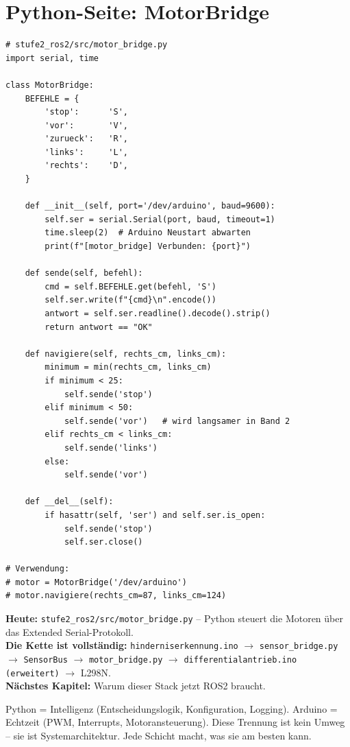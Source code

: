 \section{Python-Seite: MotorBridge}

\begin{lstlisting}[style=python]
# stufe2_ros2/src/motor_bridge.py
import serial, time

class MotorBridge:
    BEFEHLE = {
        'stop':      'S',
        'vor':       'V',
        'zurueck':   'R',
        'links':     'L',
        'rechts':    'D',
    }

    def __init__(self, port='/dev/arduino', baud=9600):
        self.ser = serial.Serial(port, baud, timeout=1)
        time.sleep(2)  # Arduino Neustart abwarten
        print(f"[motor_bridge] Verbunden: {port}")

    def sende(self, befehl):
        cmd = self.BEFEHLE.get(befehl, 'S')
        self.ser.write(f"{cmd}\n".encode())
        antwort = self.ser.readline().decode().strip()
        return antwort == "OK"

    def navigiere(self, rechts_cm, links_cm):
        minimum = min(rechts_cm, links_cm)
        if minimum < 25:
            self.sende('stop')
        elif minimum < 50:
            self.sende('vor')   # wird langsamer in Band 2
        elif rechts_cm < links_cm:
            self.sende('links')
        else:
            self.sende('vor')

    def __del__(self):
        if hasattr(self, 'ser') and self.ser.is_open:
            self.sende('stop')
            self.ser.close()

# Verwendung:
# motor = MotorBridge('/dev/arduino')
# motor.navigiere(rechts_cm=87, links_cm=124)
\end{lstlisting}

\begin{projektBox}
\textbf{Heute:} \texttt{stufe2\_ros2/src/motor\_bridge.py} --
Python steuert die Motoren über das Extended Serial-Protokoll.\\
\textbf{Die Kette ist vollständig:}
\texttt{hinderniserkennung.ino} $\to$ \texttt{sensor\_bridge.py}
$\to$ \texttt{SensorBus} $\to$ \texttt{motor\_bridge.py}
$\to$ \texttt{differentialantrieb.ino (erweitert)} $\to$ L298N.\\
\textbf{Nächstes Kapitel:} Warum dieser Stack jetzt ROS2 braucht.
\end{projektBox}

\begin{merksatzBox}
Python = Intelligenz (Entscheidungslogik, Konfiguration, Logging).
Arduino = Echtzeit (PWM, Interrupts, Motoransteuerung).
Diese Trennung ist kein Umweg -- sie ist Systemarchitektur.
Jede Schicht macht, was sie am besten kann.
\end{merksatzBox}

